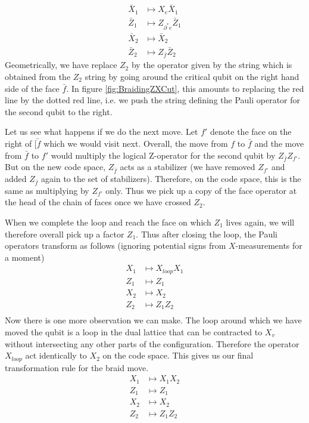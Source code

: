 \documentclass[a4paper, draft]{article}
\theoremstyle{own}
\theoremstyle{remark}
\begin{document}
\begin{align*}
\bar{X}_1 &\mapsto  X_e \bar{X}_1 \\
\bar{Z}_1 &\mapsto Z_{\partial^* e} \bar{Z}_1 \\
\bar{X}_2 &\mapsto   \bar{X}_2 \\
\bar{Z}_2 &\mapsto   Z_{\bar{f}} \bar{Z}_2 
\end{align*}
Geometrically, we have replace $Z_2$ by the operator given by the string which is obtained from the $Z_2$ string by going around the critical qubit on the right hand side of the face $\bar{f}$. In figure \ref{fig:BraidingZXCut}, this amounts to replacing the red line by the dotted red line, i.e. we push the string defining the Pauli operator for the second qubit to the right. 

Let us see what happens if we do the next move. Let $f'$ denote the face on the right of $\bar{[f}$ which we would visit next. Overall, the move from $f$ to $\bar{f}$ and the move from $\bar{f}$ to $f'$ would multiply the logical Z-operator for the second qubit by $Z_{\bar{f}} Z_{f'}$. But on the new code space, $Z_{\bar{f}}$ acts as a stabilizer (we have removed $Z_{f'}$ and added $Z_{\bar{f}}$ again to the set of stabilizers). Therefore, on the code space, this is the same as multiplying by $Z_{f'}$ only. Thus we pick up a copy of the face operator at the head of the chain of faces once we have crossed $Z_2$. 

When we complete the loop and reach the face on which $Z_1$ lives again, we will therefore overall pick up a factor $Z_1$. Thus after closing the loop, the Pauli operators transform as follows (ignoring potential signs from $X$-measurements for a moment)
\begin{align*}
X_1 &\mapsto  X_{loop} X_1 \\
Z_1 &\mapsto Z_1 \\
X_2 &\mapsto   X_2 \\
Z_2 &\mapsto   Z_1 Z_2 \\
\end{align*}
Now there is one more observation we can make. The loop around which we have moved the qubit is a loop in the dual lattice that can be contracted to $X_v$ without intersecting any other parts of the configuration. Therefore the operator $X_{loop}$ act identically to $X_2$ on the code space. This gives us our final transformation rule for the braid move.
\begin{align*}
X_1 &\mapsto  X_1 X_2 \\
Z_1 &\mapsto Z_1 \\
X_2 &\mapsto   X_2 \\
Z_2 &\mapsto   Z_1 Z_2 \\
\end{align*}
\end{document}
